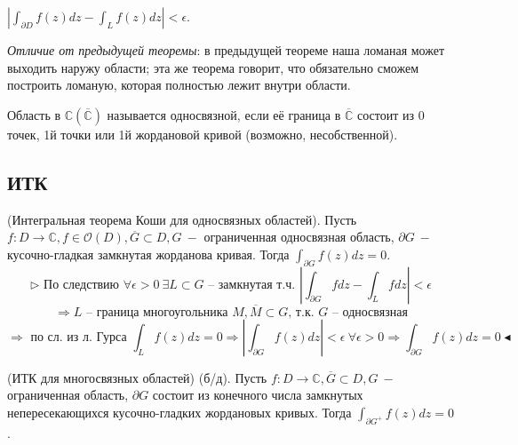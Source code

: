 $\left|\int_{\partial D} f(z) dz - \int_L f(z) dz\right| < \epsilon$.

\textit{Отличие от предыдущей теоремы}: в предыдущей теореме наша ломаная может выходить наружу области; эта же теорема говорит, что обязательно сможем построить ломаную, которая полностью лежит внутри области.

 Область в $\mathbb{C} (\overline{\mathbb{C}})$ называется односвязной, если её граница в $\overline{\mathbb{C}}$ состоит из 0 точек, 1й точки или 1й жордановой кривой (возможно, несобственной).

\subsection{ИТК}
 (Интегральная теорема Коши для односвязных областей). Пусть $f:D \to \mathbb{C}, f \in \mathcal{O}(D), \overline{G} \subset D, G \ - $ ограниченная односвязная область, $\partial G \ -$ кусочно-гладкая замкнутая жорданова кривая. Тогда $\int_{\partial G} f(z) dz = 0$.
\[\triangleright \text{ По следствию } \forall \epsilon > 0 \ \exists L \subset G \text{ -- замкнутая т.ч. } \left|\int_{\partial G} f dz - \int_L fdz\right| < \epsilon\]
\[\Rightarrow L \text{ -- граница многоугольника } M, \overline{M} \subset G \text{, т.к. $G$ -- односвязная}\]
\[\Rightarrow \text{ по сл. из л. Гурса } \int_L f(z) dz = 0 \Rightarrow \left|\int_{\partial G} f(z) dz\right| < \epsilon \ \forall \epsilon > 0 \Rightarrow \int_{\partial G} f(z) dz = 0 \blacktriangleleft\]

 (ИТК для многосвязных областей) (б/д). Пусть $f:D\to \mathbb{C}, \overline{G} \subset D, G \ -$ ограниченная область, $\partial G$ состоит из конечного числа замкнутых непересекающихся кусочно-гладких жордановых кривых. Тогда $\int_{\partial G^+} f(z) dz = 0$.
